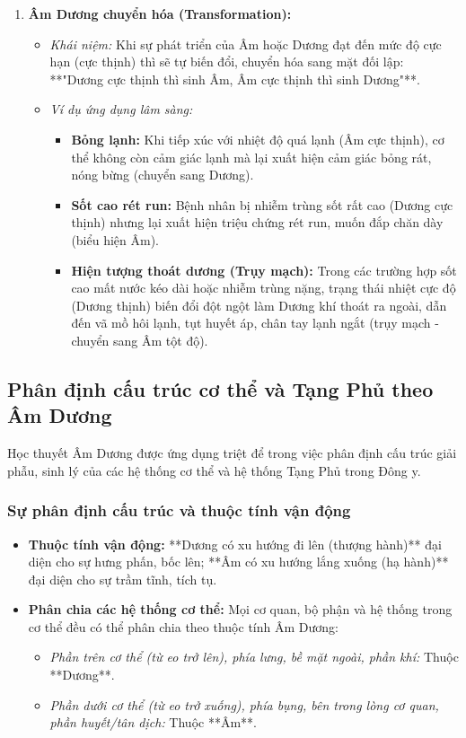 \begin{enumerate}
    \item \textbf{Âm Dương chuyển hóa (Transformation):}
    \begin{itemize}
        \item \textit{Khái niệm:} Khi sự phát triển của Âm hoặc Dương đạt đến mức độ cực hạn (cực thịnh) thì sẽ tự biến đổi, chuyển hóa sang mặt đối lập: **"Dương cực thịnh thì sinh Âm, Âm cực thịnh thì sinh Dương"**.
        \item \textit{Ví dụ ứng dụng lâm sàng:}
        \begin{itemize}
            \item \textbf{Bỏng lạnh:} Khi tiếp xúc với nhiệt độ quá lạnh (Âm cực thịnh), cơ thể không còn cảm giác lạnh mà lại xuất hiện cảm giác bỏng rát, nóng bừng (chuyển sang Dương).
            \item \textbf{Sốt cao rét run:} Bệnh nhân bị nhiễm trùng sốt rất cao (Dương cực thịnh) nhưng lại xuất hiện triệu chứng rét run, muốn đắp chăn dày (biểu hiện Âm).
            \item \textbf{Hiện tượng thoát dương (Trụy mạch):} Trong các trường hợp sốt cao mất nước kéo dài hoặc nhiễm trùng nặng, trạng thái nhiệt cực độ (Dương thịnh) biến đổi đột ngột làm Dương khí thoát ra ngoài, dẫn đến vã mồ hôi lạnh, tụt huyết áp, chân tay lạnh ngắt (trụy mạch - chuyển sang Âm tột độ).
        \end{itemize}
    \end{itemize}
\end{enumerate}

\subsection{Phân định cấu trúc cơ thể và Tạng Phủ theo Âm Dương}

Học thuyết Âm Dương được ứng dụng triệt để trong việc phân định cấu trúc giải phẫu, sinh lý của các hệ thống cơ thể và hệ thống Tạng Phủ trong Đông y.

\subsubsection{Sự phân định cấu trúc và thuộc tính vận động}
\begin{itemize}
    \item \textbf{Thuộc tính vận động:} **Dương có xu hướng đi lên (thượng hành)** đại diện cho sự hưng phấn, bốc lên; **Âm có xu hướng lắng xuống (hạ hành)** đại diện cho sự trầm tĩnh, tích tụ.
    \item \textbf{Phân chia các hệ thống cơ thể:} Mọi cơ quan, bộ phận và hệ thống trong cơ thể đều có thể phân chia theo thuộc tính Âm Dương:
    \begin{itemize}
        \item \textit{Phần trên cơ thể (từ eo trở lên), phía lưng, bề mặt ngoài, phần khí:} Thuộc **Dương**.
        \item \textit{Phần dưới cơ thể (từ eo trở xuống), phía bụng, bên trong lòng cơ quan, phần huyết/tân dịch:} Thuộc **Âm**.
    \end{itemize}
\end{itemize}

